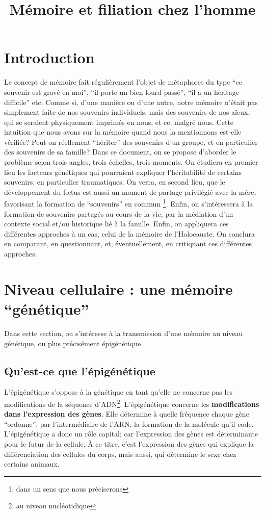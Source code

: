 \documentclass[french]{article}
\title{Mémoire et filiation chez l'homme}
\begin{document}
	
	\maketitle
	\tableofcontents
	\section*{Introduction}
		Le concept de mémoire fait régulièrement l'objet de métaphores du type ``ce souvenir est gravé en moi'', ``il porte un bien lourd passé'', ``il a un héritage difficile'' etc. Comme si, d'une manière ou d'une autre, notre mémoire n'était pas simplement faite de nos souvenirs individuels, mais des souvenirs de nos aïeux, qui se seraient physiquement imprimés en nous, et ce, malgré nous. Cette intuition que nous avons sur la mémoire quand nous la mentionnons est-elle vérifiée? Peut-on réellement ``hériter'' des souvenirs d'un groupe, et en particulier des souvenirs de sa famille? Dans ce document, on se propose d'aborder le problème selon trois angles, trois échelles, trois moments. On étudiera en premier lieu les facteurs génétiques qui pourraient expliquer l'héritabilité de certains souvenirs, en particulier traumatiques. On verra, en second lieu, que le développement du fœtus est aussi un moment de partage privilégié avec la mère, favorisant la formation de ``souvenirs'' en commun \footnote{dans un sens que nous préciserons}. Enfin, on s'intéressera à la formation de souvenirs partagés au cours de la vie, par la médiation d'un contexte social et/ou historique lié à la famille. Enfin, on appliquera ces différentes approches à un cas, celui de la mémoire de l'Holocauste. On conclura en comparant, en questionnant, et, éventuellement, en critiquant ces différentes approches.
		\section{Niveau cellulaire : une mémoire ``génétique''}\label{genetique}
			Dans cette section, on s'intéresse à la transmission d'une mémoire au niveau génétique, ou plus précisément épigénétique.
			\subsection{Qu'est-ce que l'épigénétique}
				L'épigénétique s'oppose à la génétique en tant qu'elle ne concerne pas les modifications de la séquence d'ADN\footnote{au niveau nucléotidique}. L'épigénétique concerne les \textbf{modifications dans l'expression des gènes}. Elle détermine à quelle fréquence chaque gène ``ordonne'', par l'intermédiaire de l'ARN, la formation de la molécule qu'il code. L'épigénétique a donc un rôle capital; car l'expression des gènes est déterminante pour le futur de la cellule. À ce titre, c'est l'expression des gènes qui explique la différenciation des cellules du corps, mais aussi, qui détermine le sexe chez certains animaux.\\
				
\end{document}
